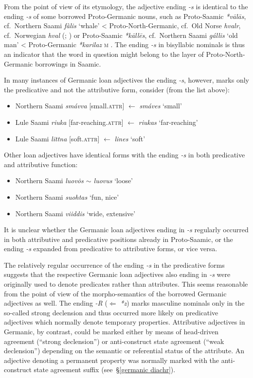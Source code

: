 {From the point of view of its etymology, the adjective ending \textit{-s} is identical to the ending \textit{-s} of some borrowed Proto-Germanic nouns, such as Proto-Saamic \textit{*vālās}, cf.~Northern Saami \textit{fàlis} ‘whale’ < Proto-North-Germanic, cf.~Old Norse \textit{hvalr}, cf.~Norwegian \textit{hval} (\citealt[144]{qvigstad1893}; \citealt[144–145]{lehtiranta1989}) or Proto-Saamic \textit{*kāllēs}, cf.~Northern Saami \textit{gállis} ‘old man’ < Proto-Germanic \textit{*karilaz} \textsc{m} \cite[44–45]{lehtiranta1989}. The ending \textit{-s} in bisyllabic nominals is thus an indicator that the word in question might belong to the layer of Proto-North-Germanic borrowings in Saamic.

In many instances of Germanic loan adjectives the ending \textit{-s}, however, marks only the predicative and not the attributive form, consider (from the list above):
\begin{itemize}
\item Northern Saami \textit{smávva} [small.\textsc{attr}] $\leftarrow$ \textit{smáves} ‘small’
\item Lule Saami \textit{riuka} [far-reaching.\textsc{attr}] $\leftarrow$ \textit{riukas} ‘far-reaching’
\item Lule Saami \textit{littna} [soft.\textsc{attr}] $\leftarrow$ \textit{lines} ‘soft’
\end{itemize}
Other loan adjectives have identical forms with the ending \textit{-s} in both predicative and attributive function:
\begin{itemize}
\item Northern Saami \textit{luov\.{o}s $\sim$ luovus} ‘loose'
\item Northern Saami \textit{suohtas} ‘fun, nice'
\item Northern Saami \textit{viiddis} ‘wide, extensive'
\end {itemize}
It is unclear whether the Germanic loan adjectives ending in \textit{-s} regularly occurred in both attributive and predicative positions already in Proto-Saamic, or the ending \textit{-s} expanded from predicative to attributive forms, or vice versa.

The relatively regular occurrence of the ending \textit{-s} in the predicative forms suggests that the respective Germanic loan adjectives also ending in \textit{-s} were originally used to denote predicates rather than attributes. This seems reasonable from the point of view of the morpho-semantics of the borrowed Germanic adjectives as well. The ending \textit{-R} ($\Leftarrow$ \textit{*z}) marks masculine nominals only in the so-called strong declension and thus occurred more likely on predicative adjectives which normally denote temporary properties. Attributive adjectives in Germanic, by contrast, could be marked either by means of head-driven agreement (“strong declension”) or anti-construct state agreement (“weak declension”) depending on the semantic or referential status of the attribute. An adjective denoting a permanent property was normally marked with the anti-construct state agreement suffix (see~\S\ref{germanic diachr}).

}
